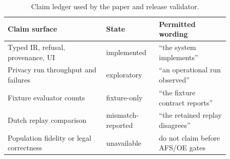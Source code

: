 \begin{table}[h]
\centering
\caption{Claim ledger used by the paper and release validator.}
\label{tab:evidence-ledger}
\begin{tabular}{p{0.39\linewidth}p{0.18\linewidth}p{0.29\linewidth}}
\toprule
Claim surface & State & Permitted wording \\
\midrule
Typed IR, refusal, provenance, UI & implemented & ``the system implements'' \\
Privacy run throughput and failures & exploratory & ``an operational run observed'' \\
Fixture evaluator counts & fixture-only & ``the fixture contract reports'' \\
Dutch replay comparison & mismatch-reported & ``the retained replay disagrees'' \\
Population fidelity or legal correctness & unavailable & do not claim before AFS/OE gates \\
\bottomrule
\end{tabular}
\end{table}
